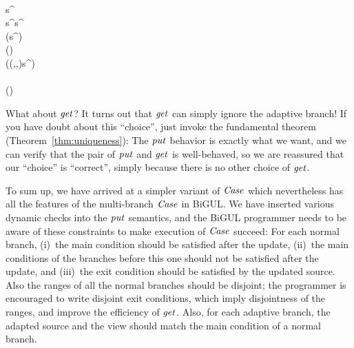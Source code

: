 \begin{hscode}
\>[52]{}\;{}\<[58]%
\>[58]{}\<[E]%
\\
\>[B]{}\<[3]%
\>[3]{}\;\;{}\<[12]%
\>[12]{}\;{}\<[16]%
\>[16]{}\;\;{}\<[21]%
\>[21]{}\;{}\<[27]%
\>[27]{}\;{}\<[31]%
\>[31]{}s^\prime\leftarrow {}\;\;{}\<[44]%
\>[44]{}\;\<[E]%
\\
\>[31]{}\;\;s^\prime\;\mathrel{\wedge}\;s^\prime{}\<[E]%
\\
\>[31]{}\<[33]%
\>[33]{}\;{}\<[39]%
\>[39]{}\;{}\<[46]%
\>[46]{}(\;s^\prime)\;{}\<[E]%
\\
\>[46]{}(\;)\;{}\<[E]%
\\
\>[46]{}(\;(,,)\;{}\<[70]%
\>[70]{}s^\prime){}\<[E]%
\\
\>[31]{}\<[33]%
\>[33]{}\;{}\<[39]%
\>[39]{}\<[E]%
\\
\>[B]{}\<[3]%
\>[3]{}\;\;{}\<[12]%
\>[12]{}\;{}\<[16]%
\>[16]{}\;\;{}\<[21]%
\>[21]{}\;{}\<[27]%
\>[27]{}\;(\;\;){}\<[E]%
\\
\>[B]{}\<[3]%
\>[3]{}\;{}\<[9]%
\>[9]{}\<[E]%
\ColumnHook
\end{hscode}\resethooks

What about \ensuremath{\Varid{get}}?
It turns out that \ensuremath{\Varid{get}} can simply ignore the adaptive branch!
If you have doubt about this ``choice'', just invoke the fundamental theorem (Theorem~\ref{thm:uniqueness}): The \ensuremath{\Varid{put}} behavior is exactly what we want, and we can verify that the pair of \ensuremath{\Varid{put}} and \ensuremath{\Varid{get}} is well-behaved, so we are reassured that our ``choice'' is ``correct'', simply because there is no other choice of \ensuremath{\Varid{get}}.

To sum up, we have arrived at a simpler variant of \ensuremath{\Conid{Case}} which nevertheless has all the features of the multi-branch \ensuremath{\Conid{Case}} in BiGUL.
We have inserted various dynamic checks into the \ensuremath{\Varid{put}} semantics, and the BiGUL programmer needs to be aware of these constraints to make execution of \ensuremath{\Conid{Case}} succeed:
For each normal branch, (i)~the main condition should be satisfied after the update,
(ii)~the main conditions of the branches before this one should not be satisfied after the update, and
(iii)~the exit condition should be satisfied by the updated source.
Also the ranges of all the normal branches should be disjoint; the programmer is encouraged to write disjoint exit conditions, which imply disjointness of the ranges, and improve the efficiency of \ensuremath{\Varid{get}}.
Also, for each adaptive branch, the adapted source and the view should match the main condition of a normal branch.

